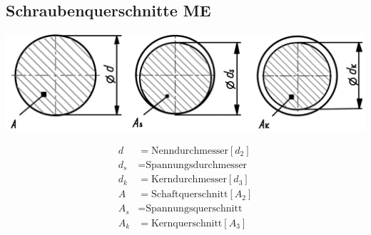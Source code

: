 \subsection{Schraubenquerschnitte \hfill ME}
\begin{footnotesize}
    \begin{minipage}{0.55\linewidth}
        \begin{center}
            \includegraphics[width = 0.9\linewidth]{MAEIP_Schraubenquerschnitte}
        \end{center}
    \end{minipage}
\end{footnotesize}
    \begin{minipage}{0.4\linewidth}
        \begin{scriptsize}
        \begin{center}
            \begin{align*}
                d &= \text{Nenndurchmesser} [d_2]
                \\d_s &= \text{Spannungsdurchmesser}
                \\d_k &= \text{Kerndurchmesser} [d_3]
                \\A &= \text{Schaftquerschnitt} [A_2]
                \\A_s &= \text{Spannungsquerschnitt}
                \\A_k &= \text{Kernquerschnitt} [A_3]
            \end{align*}
        \end{center}
    \end{scriptsize}
    \end{minipage}